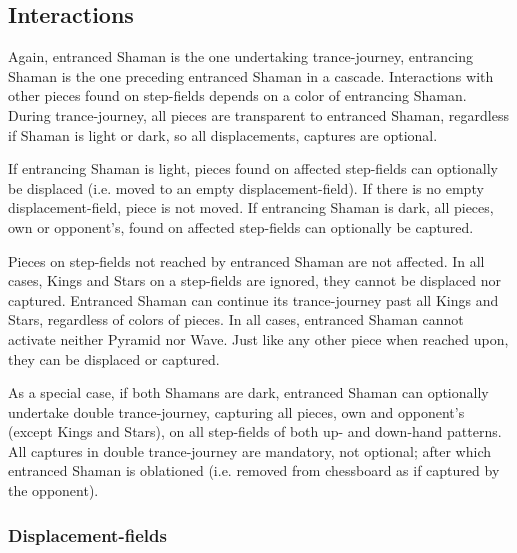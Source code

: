 \subsection*{Interactions}
\label{sec:Conquest of Tlalocan/Trance-journey/Interactions}

Again, entranced Shaman is the one undertaking trance-journey, entrancing Shaman
is the one preceding entranced Shaman in a cascade. Interactions with other pieces
found on step-fields depends on a color of entrancing Shaman. During trance-journey,
all pieces are transparent to entranced Shaman, regardless if Shaman is light or
dark, so all displacements, captures are optional.

If entrancing Shaman is light, pieces found on affected step-fields can optionally
be displaced (i.e. moved to an empty displacement-field). If there is no empty
displacement-field, piece is not moved. \newline
\indent
If entrancing Shaman is dark, all pieces, own or opponent's, found on affected
step-fields can optionally be captured.

Pieces on step-fields not reached by entranced Shaman are not affected. In all
cases, Kings and Stars on a step-fields are ignored, they cannot be displaced
nor captured. Entranced Shaman can continue its trance-journey past all Kings
and Stars, regardless of colors of pieces. \newline
\indent
In all cases, entranced Shaman cannot activate neither Pyramid nor Wave. Just
like any other piece when reached upon, they can be displaced or captured.

As a special case, if both Shamans are dark, entranced Shaman can optionally
undertake double trance-journey, capturing all pieces, own and opponent's
(except Kings and Stars), on all step-fields of both up- and down-hand patterns.
All captures in double trance-journey are mandatory, not optional; after which
entranced Shaman is oblationed (i.e. removed from chessboard as if captured
by the opponent).


\subsubsection*{Displacement-fields}
\label{sec:Conquest of Tlalocan/Trance-journey/Interactions/Displacement-fields}

